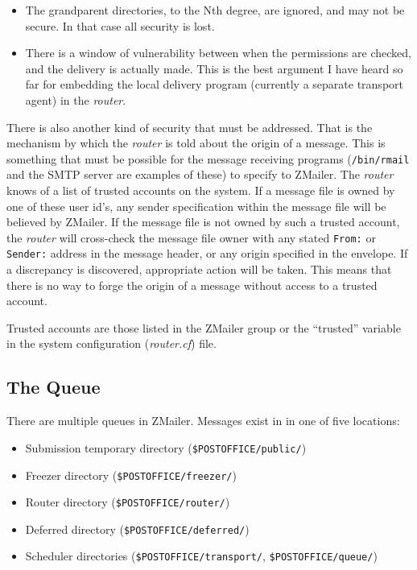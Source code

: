 \begin{itemize}
\item The grandparent directories, to the Nth degree, are ignored, and may
not be secure. In that case all security is lost.
\item There is a window of vulnerability between when the permissions are
checked, and the delivery is actually made. This is the best argument
I have heard so far for embedding the local delivery program
(currently a separate transport agent) in the {\em router\/}.
\end{itemize}


There is also another kind of security that must be addressed.  That is the
mechanism by which the {\em router\/} is told about the origin of a message.  This
is something that must be possible for the message receiving programs
({\tt /bin/rmail} and the SMTP server are examples of these) to specify to
ZMailer.  The {\em router\/} knows of a list of trusted accounts on the system.  If
a message file is owned by one of these user id's, any sender specification
within the message file will be believed by ZMailer.  If the message file
is not owned by such a trusted account, the {\em router\/} will cross-check the
message file owner with any stated {\tt From:} or {\tt Sender:} address 
in the message header, or any origin specified in the envelope.  If a 
discrepancy is discovered, appropriate action will be taken.  This means 
that there is no way to forge the origin of a message without access to a 
trusted account.

Trusted accounts are those listed in the ZMailer group or the ``trusted'' 
variable in the system configuration ({\em router.cf\/}) file.



\subsection{The Queue}

There are multiple queues in ZMailer. Messages exist in
in one of five locations:

\begin{itemize}
\item Submission temporary directory ({\tt \$POSTOFFICE/public/})
\item Freezer directory ({\tt \$POSTOFFICE/freezer/})
\item Router directory ({\tt \$POSTOFFICE/router/})
\item Deferred directory ({\tt \$POSTOFFICE/deferred/})
\item Scheduler directories ({\tt \$POSTOFFICE/transport/}, 
{\tt \$POSTOFFICE/queue/})
\end{itemize}

